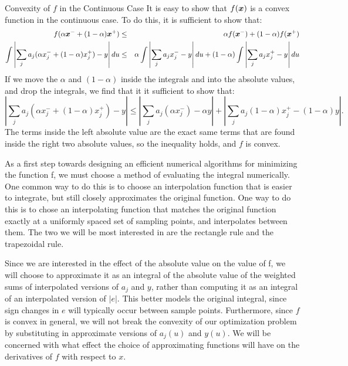 \documentclass[12pt,journal,draftcls,letterpaper,onecolumn]{IEEEtran}
\begin{document}
{Convexity of $f$ in the Continuous Case } It is easy to show that $f({\boldsymbol{x}})$ is a convex function in the continuous case.  To do this, it is sufficient to show that:
\begin{eqnarray*}
f(\alpha {\boldsymbol{x}}^- + (1-\alpha) {\boldsymbol{x}}^+) 
	&\leq& \alpha f({\boldsymbol{x}}^-) + (1-\alpha) f({\boldsymbol{x}}^+) \\
\int \left|\sum_j a_j (\alpha x_j^- + (1-\alpha) x_j^+) - y\right| du 
	&\leq& \alpha \int \left|\sum_j a_j x_j^- - y\right|du + (1 - \alpha) \int \left|\sum_j a_j x_j^+ - y\right|du
\end{eqnarray*}
If we move the $\alpha$ and $(1-\alpha)$ inside the integrals and into the absolute values, and drop the integrals, we find that it it sufficient to show that:
\begin{equation*}
\left|\sum_j a_j (\alpha x_j^- + (1-\alpha) x_j^+) - y\right|
	\leq \left|\sum_j a_j (\alpha x_j^-) - \alpha y\right| + \left|\sum_j a_j (1 - \alpha) x_j^+ - (1 - \alpha) y\right|.
\end{equation*}
The terms inside the left absolute value are the exact same terms that are found inside the right two absolute values, so the inequality holds, and $f$ is convex. 


As a first step towards designing an efficient numerical algorithms for minimizing the function f, we must choose a method of evaluating the integral numerically.  One common way to do this is to choose an interpolation function that is easier to integrate, but still closely approximates the original function.  One way to do this is to chose an interpolating function that matches the original function exactly at a uniformly spaced set of sampling points, and interpolates between them.  The two we will be most interested in are the rectangle rule and the trapezoidal rule.  

Since we are interested in the effect of the absolute value on the value of f, we will choose to approximate it as an integral of the absolute value of the weighted sums of interpolated versions of $a_j$ and $y$, rather than computing it as an integral of an interpolated version of $|e|$.  This better models the original integral, since sign changes in $e$ will typically occur between sample points.  Furthermore, since $f$ is convex in general, we will not break the convexity of our optimization problem by substituting in approximate versions of $a_j(u)$ and $y(u)$.  We will be concerned with what effect the choice of approximating functions will have on the derivatives of $f$ with respect to $x$.
\end{document}
